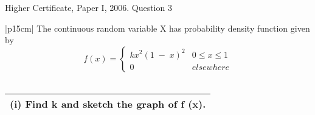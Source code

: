 \documentclass[a4paper,30pt]{article}
\begin{document}
Higher Certificate, Paper I, 2006. Question 3
\begin{table}[ht!]
     \centering
     \begin{tabular}{|p{15cm}|}
     \hline        
\noindent  The continuous random variable X has probability density function given by
\[ f(x) = \begin{cases}  kx^2(1\;-\;x)^2  & 0 \leq x \leq 1\\
0 &  elsewhere
\end{cases}
\]
\\ \hline
      \end{tabular}
    \end{table}

\begin{table}[ht!]
     \centering
     \begin{tabular}{|p{15cm}|}
     \hline        
\noindent (i) Find k and sketch the graph of f (x).


\\ \hline
      \end{tabular}
    \end{table}
    
\end{document}
